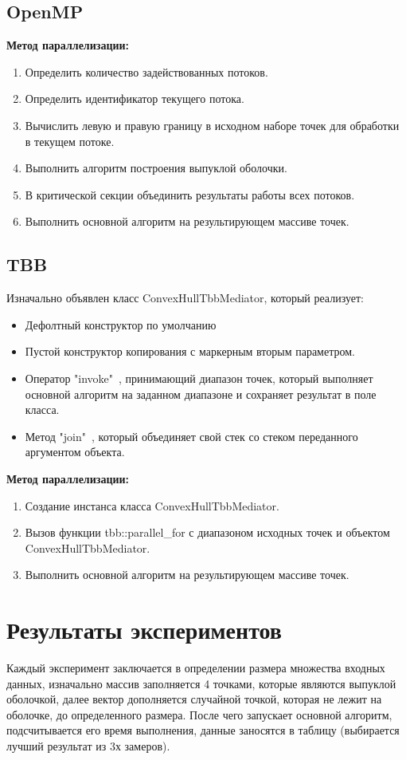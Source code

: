\documentclass[14pt, a4paper]{extarticle}
\begin{document}
    \subsection{OpenMP}
    \textbf{Метод параллелизации:}\\
  \begin{enumerate}
    \item Определить количество задействованных потоков.
    \item Определить идентификатор текущего потока.
    \item Вычислить левую и правую границу в исходном наборе точек для обработки в текущем потоке.
    \item Выполнить алгоритм построения выпуклой оболочки.
    \item В критической секции объединить результаты работы всех потоков.
    \item Выполнить основной алгоритм на результирующем массиве точек.
  \end{enumerate}

   \subsection{TBB}
   Изначально объявлен класс ConvexHullTbbMediator, который реализует:
   \begin{itemize}
       \item Дефолтный конструктор по умолчанию
       \item Пустой конструктор копирования с маркерным вторым параметром. 
       \item Оператор "invoke"\ , принимающий диапазон точек, который выполняет основной алгоритм на заданном диапазоне и сохраняет результат в поле класса.
       \item Метод "join"\ , который объединяет свой стек со стеком переданного аргументом объекта.
   \end{itemize}
    \textbf{Метод параллелизации:}
  \begin{enumerate}
    \item Создание инстанса класса ConvexHullTbbMediator.
        \item Вызов функции tbb::parallel\_for с диапазоном исходных точек и объектом ConvexHullTbbMediator.
        \item Выполнить основной алгоритм на результирующем массиве точек.
  \end{enumerate}
 

  \newpage

  \section{Результаты экспериментов}
  Каждый эксперимент заключается в определении размера множества входных данных, изначально массив заполняется 4 точками, которые являются выпуклой оболочкой, далее вектор дополняется случайной точкой, которая не лежит на оболочке, до определенного размера. После чего запускает основной алгоритм, подсчитывается его время выполнения, данные заносятся в таблицу (выбирается лучший результат из 3х замеров).
 
\end{document}
